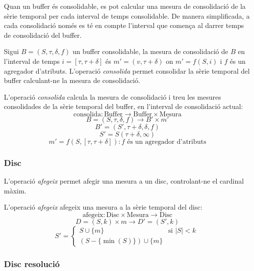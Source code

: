 Quan un buffer és consolidable, es pot calcular una mesura de consolidació de la sèrie temporal per cada interval de temps consolidable. De manera simplificada, a cada consolidació només es té en compte l'interval que comença al darrer temps de consolidació del buffer. 

Sigui $B=(S,\tau,\delta,f)$ un buffer consolidable, la mesura de consolidació de $B$ en l'interval de temps $i=[\tau,\tau+\delta]$ és $m'=(v,\tau+\delta)$ on $m'=f(S,i)$ i $f$ és un agregador d'atributs. L'operació \emph{consolida} permet consolidar la sèrie temporal del buffer calculant-ne la mesura de consolidació.

\begin{definition}
  L'operació \emph{consolida} calcula la mesura de consolidació i treu
  les mesures consolidades de la sèrie temporal del buffer, en
  l'interval de consolidació actual:
  \[
  \text{consolida}: \text{Buffer} \longrightarrow \text{Buffer} \times \text{Mesura}
  \]
  \[
  B=(S,\tau,\delta,f) \longrightarrow B' \times m'
  \]
  \[
  B'= (S',\tau+\delta,\delta,f)
  \]
  \[
  S' = S(\tau+\delta,\infty)
  \]
  \[
  m' = f(S,[\tau,\tau+\delta]): f \text{ és un agregador d'atributs}
  \]
\end{definition}





\subsubsection{Disc}

L'operació \emph{afegeix} permet afegir una mesura a un disc, controlant-ne el cardinal màxim.

\begin{definition}
  L'operació \emph{afegeix} afegeix una mesura a la sèrie temporal del disc:
  \[
  \text{afegeix}: \text{Disc} \times \text{Mesura} \longrightarrow \text{Disc}
  \]
  \[
  D=(S,k) \times m \longrightarrow D'= (S',k)
  \]
  \[
  S' =  
  \begin{cases}
      S\cup\{m\} &\text{si }  |S|<k\\
      (S-\{\min(S)\}) \cup \{m\} 
    \end{cases}  \
  \]
\end{definition}





\subsubsection{Disc resolució}


